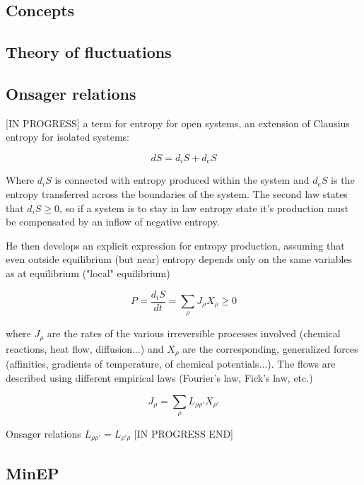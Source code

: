 \documentclass[a4paper,12pt]{article}
\begin{document}
\subsection{Concepts}
\subsection{Theory of fluctuations}
\subsection{Onsager relations}
[IN PROGRESS]
a term for entropy for open systems, an extension of Clausius entropy for isolated systems:

\begin{displaymath}
	dS=d_iS+d_eS
\end{displaymath}


Where \(d_iS\) is connected with entropy produced within the system and \(d_eS\) is the entropy transferred across the boundaries of the system.
The second law states that \(d_iS\geq 0\), so if a system is to stay in law entropy state it{'}s production must be compensated by an inflow of negative
entropy.

He then develops an explicit expression for entropy production, assuming that even outside equilibrium (but near) entropy depends only on the same
variables as at equilibrium ("local" equilibrium)

\begin{displaymath}
	P=\frac{d_iS}{dt}=\sum _{\rho } J_{\rho }X_{\rho }\geq 0
\end{displaymath}


where \(J_{\rho }\) are the rates of the various irreversible processes involved (chemical reactions, heat flow, diffusion$\ldots $) and \(X_{\rho
}\) are the corresponding, generalized forces (affinities, gradients of temperature, of chemical potentials$\ldots $). The flows are described using
different empirical laws (Fourier{'}s law, Fick{'}s law, etc.) 

\begin{displaymath}
	J_{\rho }=\sum _{\rho } L_{\rho \rho '}X_{\rho '}
\end{displaymath}

Onsager relations \(L_{\rho \rho '}=L_{\rho '\rho }\)
[IN PROGRESS END]

\subsection{MinEP}
\end{document}
